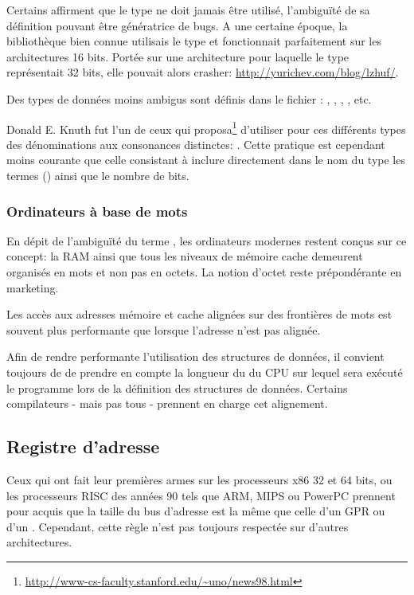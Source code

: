 Certains affirment que le type  ne doit jamais être utilisé, l'ambiguïté de sa définition pouvant être génératrice de bugs.
A une certaine époque, la bibliothèque bien connue  utilisais le type  et fonctionnait parfaitement sur les architectures 16 bits.
Portée sur une architecture pour laquelle le type  représentait 32 bits, elle pouvait alors crasher: \url{http://yurichev.com/blog/lzhuf/}.

Des types de données moins ambigus sont définis dans le fichier :
, , , , etc.

Donald E. Knuth fut l'un de ceux qui proposa\footnote{\url{http://www-cs-faculty.stanford.edu/~uno/news98.html}}
d'utiliser pour ces différents types des dénominations aux consonances distinctes: .
Cette pratique est cependant moins courante que celle consistant à inclure directement dans le nom du type
les termes  () ainsi que le nombre de bits.

\subsubsection{Ordinateurs à base de mots}

En dépit de l'ambiguïté du terme , les ordinateurs modernes restent conçus sur ce concept: la \ac{RAM} ainsi que tous
les niveaux de mémoire cache demeurent organisés en mots et non pas en octets.
La notion d'octet reste prépondérante en marketing.

Les accès aux adresses mémoire et cache alignées sur des frontières de mots est souvent plus performante que lorsque l'adresse n'est pas alignée.

Afin de rendre performante l'utilisation des structures de données, il convient toujours de de prendre en compte la longueur du
 du CPU sur lequel sera exécuté le programme lors de la définition des structures de données.
Certains compilateurs - mais pas tous - prennent en charge cet alignement.

\subsection{Registre d'adresse}

Ceux qui ont fait leur premières armes sur les processeurs x86 32 et 64 bits, ou les processeurs RISC des années 90
tels que ARM, MIPS ou PowerPC prennent pour acquis que la taille du bus d'adresse est la même que celle d'un \ac{GPR}
ou d'un .
Cependant, cette règle n'est pas toujours respectée sur d'autres architectures.

